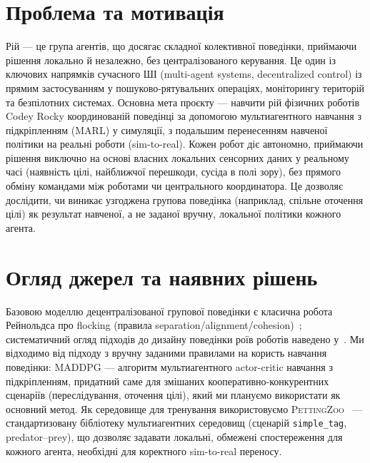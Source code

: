 \documentclass[ukrainian]{ucuproposal}
\begin{document}
\maketitlepage

\section{Проблема та мотивація}
Рій — це група агентів, що досягає складної колективної поведінки, приймаючи рішення локально й незалежно, без централізованого керування. Це один із ключових напрямків сучасного ШІ (multi-agent systems, decentralized control) із прямим застосуванням у пошуково-рятувальних операціях, моніторингу територій та безпілотних системах. Основна мета проєкту — навчити рій фізичних роботів Codey Rocky координованій поведінці за допомогою мультиагентного навчання з підкріпленням (MARL) у симуляції, з подальшим перенесенням навченої політики на реальні роботи (sim-to-real). Кожен робот діє автономно, приймаючи рішення виключно на основі власних локальних сенсорних даних у реальному часі (наявність цілі, найближчої перешкоди, сусіда в полі зору), без прямого обміну командами між роботами чи центрального координатора. Це дозволяє дослідити, чи виникає узгоджена групова поведінка (наприклад, спільне оточення цілі) як результат навченої, а не заданої вручну, локальної політики кожного агента.

\section{Огляд джерел та наявних рішень}
Базовою моделлю децентралізованої групової поведінки є класична робота Рейнольдса про flocking (правила separation/alignment/cohesion)~\cite{reynolds1987flocks}; систематичний огляд підходів до дизайну поведінки роїв роботів наведено у~\cite{brambilla2013swarm}. Ми відходимо від підходу з вручну заданими правилами на користь навчання поведінки: \cite{lowe2017maddpg} MADDPG — алгоритм мультиагентного actor-critic навчання з підкріпленням, придатний саме для змішаних кооперативно-конкурентних сценаріїв (переслідування, оточення цілі), який ми плануємо використати як основний метод. Як середовище для тренування використовуємо \textsc{PettingZoo}~\cite{terry2021pettingzoo} — стандартизовану бібліотеку мультиагентних середовищ (сценарій \texttt{simple\_tag}, predator--prey), що дозволяє задавати локальні, обмежені спостереження для кожного агента, необхідні для коректного sim-to-real переносу.
\end{document}
